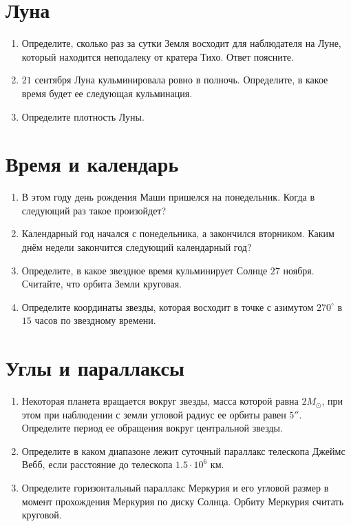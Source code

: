 \documentclass[12pt]{article}
\begin{document}
\section*{Луна}
\begin{enumerate}[resume]
	\item Определите, сколько раз за сутки Земля восходит для наблюдателя на Луне, который находится неподалеку от кратера Тихо. Ответ поясните.
    \item $21$ сентября Луна кульминировала ровно в полночь. Определите, в какое время будет ее следующая кульминация.
    \item Определите плотность Луны.
\end{enumerate}

\section*{Время и календарь}
\begin{enumerate}[resume]
    \item В этом году день рождения Маши пришелся на понедельник. Когда в следующий раз такое произойдет?
    \item Календарный год начался с понедельника, а закончился вторником. Каким днём недели закончится следующий календарный год?
    \item Определите, в какое звездное время кульминирует Солнце $27$ ноября. Считайте, что орбита Земли круговая.
    \item Определите координаты звезды, которая восходит в точке с азимутом $270^{\circ}$ в $15$ часов по звездному времени.
\end{enumerate}

\section*{Углы и параллаксы}
\begin{enumerate}[resume]
	\item Некоторая планета вращается вокруг звезды, масса которой равна $2M_{\odot}$, при этом при наблюдении с земли угловой радиус ее орбиты равен $5''$. Определите период ее обращения вокруг центральной звезды.
    \item Определите в каком диапазоне лежит суточный параллакс телескопа Джеймс Вебб, если расстояние до телескопа $1.5 \cdot 10^6$ км.
    \item Определите горизонтальный параллакс Меркурия и его угловой размер в момент прохождения Меркурия по диску Солнца. Орбиту Меркурия считать круговой.
\end{enumerate}
\end{document}
